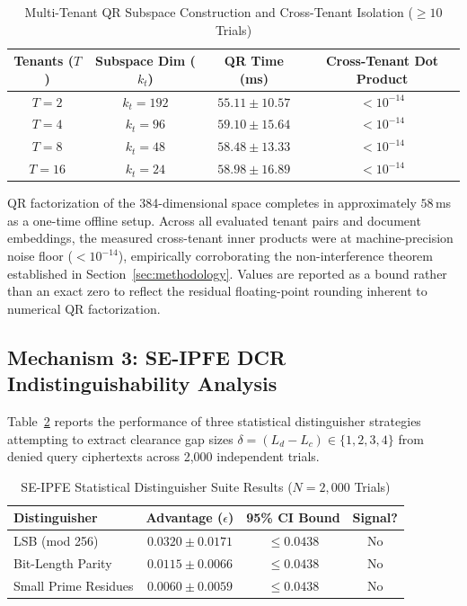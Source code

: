 \documentclass[10pt,a4paper]{article}
\begin{document}
\begin{table}[h]
\centering
\caption{Multi-Tenant QR Subspace Construction and Cross-Tenant Isolation ($\ge 10$ Trials)}
\label{tab:multitenant_results}
\renewcommand{\arraystretch}{1.15}
\small
\begin{tabular}{@{}cccc@{}}
\toprule
\textbf{Tenants ($T$)} & \textbf{Subspace Dim ($k_t$)} & \textbf{QR Time (ms)} & \textbf{Cross-Tenant Dot Product} \\ \midrule
$T = 2$  & $k_t = 192$ & $55.11 \pm 10.57$ & $< 10^{-14}$ \\
$T = 4$  & $k_t = 96$  & $59.10 \pm 15.64$ & $< 10^{-14}$ \\
$T = 8$  & $k_t = 48$  & $58.48 \pm 13.33$ & $< 10^{-14}$ \\
$T = 16$ & $k_t = 24$  & $58.98 \pm 16.89$ & $< 10^{-14}$ \\ \bottomrule
\end{tabular}
\end{table}

QR factorization of the 384-dimensional space completes in approximately $58$\,ms as a one-time offline setup. Across all evaluated tenant pairs and document embeddings, the measured cross-tenant inner products were at machine-precision noise floor ($< 10^{-14}$), empirically corroborating the non-interference theorem established in Section~\ref{sec:methodology}. Values are reported as a bound rather than an exact zero to reflect the residual floating-point rounding inherent to numerical QR factorization.

\subsection{Mechanism 3: SE-IPFE DCR Indistinguishability Analysis}
Table~\ref{tab:distinguisher_results} reports the performance of three statistical distinguisher strategies attempting to extract clearance gap sizes $\delta = (L_d - L_c) \in \{1, 2, 3, 4\}$ from denied query ciphertexts across 2,000 independent trials.

\begin{table}[h]
\centering
\caption{SE-IPFE Statistical Distinguisher Suite Results ($N=2{,}000$ Trials)}
\label{tab:distinguisher_results}
\renewcommand{\arraystretch}{1.15}
\small
\begin{tabular}{@{}lccc@{}}
\toprule
\textbf{Distinguisher} & \textbf{Advantage ($\epsilon$)} & \textbf{95\% CI Bound} & \textbf{Signal?} \\ \midrule
LSB (mod 256) & $0.0320 \pm 0.0171$ & $\le 0.0438$ & No \\
Bit-Length Parity & $0.0115 \pm 0.0066$ & $\le 0.0438$ & No \\
Small Prime Residues & $0.0060 \pm 0.0059$ & $\le 0.0438$ & No \\ \bottomrule
\end{tabular}
\end{table}
\end{document}
